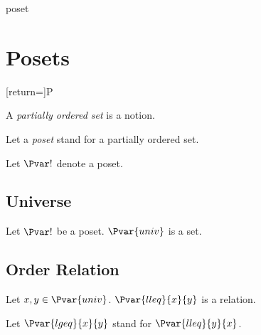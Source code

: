 \documentclass{stex}
\begin{document}
\begin{smodule}{poset}

  \section{Posets}
  [return=\poset]{\mathcal P}

  \begin{forthel}
  \end{forthel}
  
  \begin{forthel}
    \begin{signature}
      A \emph{partially ordered set} is a notion.
    \end{signature}

    Let a \emph{poset} stand for a partially ordered set.

    Let $\Pvar!$ denote a poset.
  \end{forthel}
  
  \subsection{Universe}
  
  \begin{forthel}
    \begin{signature}
      Let $\Pvar!$ be a poset.
      $\Pvar{univ}$ is a set.
    \end{signature}
  \end{forthel}
  
  \subsection{Order Relation}
  
  \begin{forthel}
    \begin{signature}
      Let $x,y\in\Pvar{univ}$.
      $\Pvar{lleq}{x}{y}$ is a relation.
    \end{signature}

    Let $\Pvar{lgeq}{x}{y}$ stand for $\Pvar{lleq}{y}{x}$.


\end{forthel}
\end{smodule}
\end{document}
